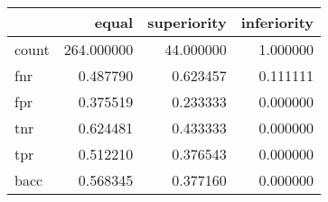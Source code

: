 \begin{tabular}{lrrr}
\toprule
{} &       equal &  superiority &  inferiority \\
\midrule
count &  264.000000 &    44.000000 &     1.000000 \\
fnr   &    0.487790 &     0.623457 &     0.111111 \\
fpr   &    0.375519 &     0.233333 &     0.000000 \\
tnr   &    0.624481 &     0.433333 &     0.000000 \\
tpr   &    0.512210 &     0.376543 &     0.000000 \\
bacc  &    0.568345 &     0.377160 &     0.000000 \\
\bottomrule
\end{tabular}

